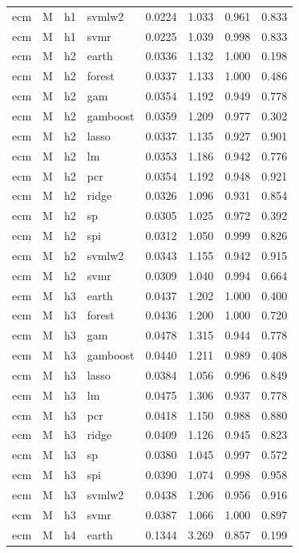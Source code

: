 \begin{ThreePartTable}
\begin{longtable}[t]{llclcccc}
ecm & M & h1 & svmlw2 & 0.0224 & 1.033 & 0.961 & 0.833\\
ecm & M & h1 & svmr & 0.0225 & 1.039 & 0.998 & 0.833\\
\addlinespace
ecm & M & h2 & earth & 0.0336 & 1.132 & 1.000 & 0.198\\
ecm & M & h2 & forest & 0.0337 & 1.133 & 1.000 & 0.486\\
ecm & M & h2 & gam & 0.0354 & 1.192 & 0.949 & 0.778\\
ecm & M & h2 & gamboost & 0.0359 & 1.209 & 0.977 & 0.302\\
ecm & M & h2 & lasso & 0.0337 & 1.135 & 0.927 & 0.901\\
ecm & M & h2 & lm & 0.0353 & 1.186 & 0.942 & 0.776\\
ecm & M & h2 & pcr & 0.0354 & 1.192 & 0.948 & 0.921\\
ecm & M & h2 & ridge & 0.0326 & 1.096 & 0.931 & 0.854\\
ecm & M & h2 & sp & 0.0305 & 1.025 & 0.972 & 0.392\\
ecm & M & h2 & spi & 0.0312 & 1.050 & 0.999 & 0.826\\
ecm & M & h2 & svmlw2 & 0.0343 & 1.155 & 0.942 & 0.915\\
ecm & M & h2 & svmr & 0.0309 & 1.040 & 0.994 & 0.664\\
\addlinespace
ecm & M & h3 & earth & 0.0437 & 1.202 & 1.000 & 0.400\\
ecm & M & h3 & forest & 0.0436 & 1.200 & 1.000 & 0.720\\
ecm & M & h3 & gam & 0.0478 & 1.315 & 0.944 & 0.778\\
ecm & M & h3 & gamboost & 0.0440 & 1.211 & 0.989 & 0.408\\
ecm & M & h3 & lasso & 0.0384 & 1.056 & 0.996 & 0.849\\
ecm & M & h3 & lm & 0.0475 & 1.306 & 0.937 & 0.778\\
ecm & M & h3 & pcr & 0.0418 & 1.150 & 0.988 & 0.880\\
ecm & M & h3 & ridge & 0.0409 & 1.126 & 0.945 & 0.823\\
ecm & M & h3 & sp & 0.0380 & 1.045 & 0.997 & 0.572\\
ecm & M & h3 & spi & 0.0390 & 1.074 & 0.998 & 0.958\\
ecm & M & h3 & svmlw2 & 0.0438 & 1.206 & 0.956 & 0.916\\
ecm & M & h3 & svmr & 0.0387 & 1.066 & 1.000 & 0.897\\
\addlinespace
ecm & M & h4 & earth & 0.1344 & 3.269 & 0.857 & 0.199\\

\end{longtable}
\end{ThreePartTable}
